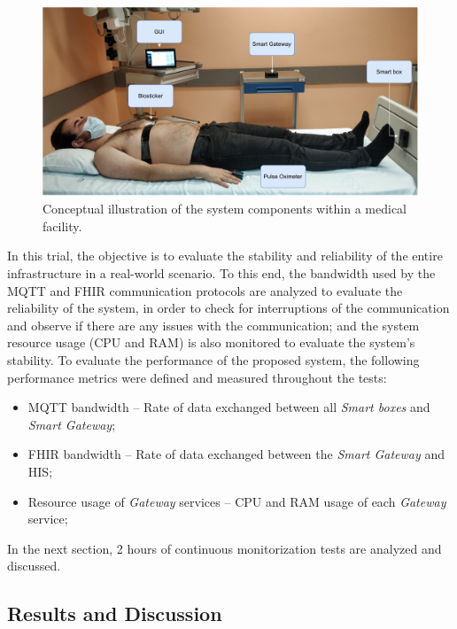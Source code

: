 \begin{figure}[H]
    \centering
    \includegraphics[width=\linewidth]{images/hospital-trial-setup.pdf}
    \caption[Conceptual illustration of the system components within a medical facility.]{Conceptual illustration of the system components within a medical facility.}
    \label{fig:hospital-trial}
\end{figure}

In this trial, the objective is to evaluate the stability and reliability of the entire infrastructure in a real-world scenario. To this end, the bandwidth used by the \acs{MQTT} and \acs{FHIR} communication protocols are analyzed to evaluate the reliability of the system, in order to check for interruptions of the communication and observe if there are any issues with the communication; and the system resource usage (\acs{CPU} and \acs{RAM}) is also monitored to evaluate the system's stability. To evaluate the performance of the proposed system, the following performance metrics were defined and measured throughout the tests:

\begin{itemize}
    \item \acs{MQTT} bandwidth -- Rate of data exchanged between all \textit{Smart boxes} and \textit{Smart Gateway};
    \item \acs{FHIR} bandwidth -- Rate of data exchanged between the \textit{Smart Gateway} and \acs{HIS};
    \item Resource usage of \textit{Gateway} services -- \acs{CPU} and \acs{RAM} usage of each \textit{Gateway} service;
\end{itemize}

In the next section, 2 hours of continuous monitorization tests are analyzed and discussed. 

\subsection{Results and Discussion}

